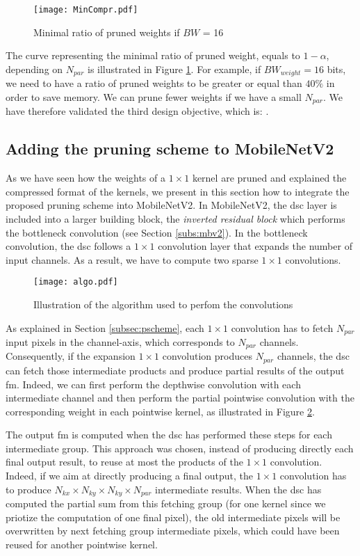 \begin{figure}
    \centering
    \texttt{[image: MinCompr.pdf]}
    \caption{Minimal ratio of pruned weights if $BW$ = 16}
    \label{fig:prun_mem}
\end{figure}
%
The curve representing the minimal ratio of pruned weight, equals to $1 - \alpha$, depending on $N_{par}$ is illustrated in Figure \ref{fig:prun_mem}. For example, if $BW_{weight} = 16$ bits, we need to have a ratio of pruned weights to be greater or equal than $40\%$ in order to save memory. We can prune fewer weights if we have a small $N_{par}$. We have therefore validated the third design objective, which is: \textbf{}.
%
\subsection{Adding the pruning scheme to MobileNetV2} \label{subsec:mbnv2-pr}
%
As we have seen how the weights of a $1 \times 1$ kernel are pruned and explained the compressed format of the kernels, we present in this section how to integrate the proposed pruning scheme into MobileNetV2. In MobileNetV2, the \acrshort{dsc} layer is included into a larger building block, the \textit{inverted residual block} which performs the bottleneck convolution (see Section \ref{subs:mbv2}). In the bottleneck convolution, the \acrshort{dsc} follows a $1 \times 1$ convolution layer that expands the number of input channels. As a result, we have to compute two sparse $1 \times 1$ convolutions.

%
\begin{figure}
    \centering
    \texttt{[image: algo.pdf]}
    \caption{Illustration of the algorithm used to perfom the convolutions}
    \label{fig:algo}
\end{figure}
%
As explained in Section \ref{subsec:pscheme}, each $1 \times 1$ convolution has to fetch $N_{par}$ input pixels in the channel-axis, which corresponds to $N_{par}$ channels. Consequently, if the expansion $1 \times 1$ convolution produces $N_{par}$ channels, the \acrshort{dsc} can fetch those intermediate products and produce partial results of the output \acrshort{fm}. Indeed, we can first perform the depthwise convolution with each intermediate channel and then perform the partial pointwise convolution with the corresponding weight in each pointwise kernel, as illustrated in Figure \ref{fig:algo}.

The output \acrshort{fm} is computed when the \acrshort{dsc} has performed these steps for each intermediate group. This approach was chosen, instead of producing directly each final output result, to reuse at most the products of the $1 \times 1$ convolution. Indeed, if we aim at directly producing a final output, the $1 \times 1$ convolution has to produce $N_{kx} \times N_{ky} \times N_{ky} \times N_{par}$ intermediate results. When the \acrshort{dsc} has computed the partial sum from this fetching group (for one kernel since we priotize the computation of one final pixel), the old intermediate pixels will be overwritten by next fetching group intermediate pixels, which could have been reused for another pointwise kernel.

